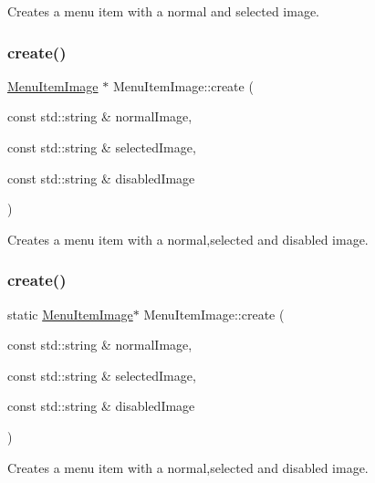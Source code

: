 Creates a menu item with a normal and selected image. \mbox{\label{classMenuItemImage_ab7a90cd28f289a7faafd9d1c7b37e78d}} 
\subsubsection{\texorpdfstring{create()}{create()}\hspace{0.1cm}{\footnotesize\ttfamily [5/14]}}
{\footnotesize\ttfamily \hyperlink{classMenuItemImage}{Menu\+Item\+Image} $\ast$ Menu\+Item\+Image\+::create (\begin{DoxyParamCaption}\item[{const std\+::string \&}]{normal\+Image,  }\item[{const std\+::string \&}]{selected\+Image,  }\item[{const std\+::string \&}]{disabled\+Image }\end{DoxyParamCaption})\hspace{0.3cm}{\ttfamily [static]}}

Creates a menu item with a normal,selected and disabled image. \mbox{\label{classMenuItemImage_af2ec388e058cb037959748c4db1daa63}} 
\subsubsection{\texorpdfstring{create()}{create()}\hspace{0.1cm}{\footnotesize\ttfamily [6/14]}}
{\footnotesize\ttfamily static \hyperlink{classMenuItemImage}{Menu\+Item\+Image}$\ast$ Menu\+Item\+Image\+::create (\begin{DoxyParamCaption}\item[{const std\+::string \&}]{normal\+Image,  }\item[{const std\+::string \&}]{selected\+Image,  }\item[{const std\+::string \&}]{disabled\+Image }\end{DoxyParamCaption})\hspace{0.3cm}{\ttfamily [static]}}

Creates a menu item with a normal,selected and disabled image. \mbox{\label{classMenuItemImage_ae36d584792a616fce4093b8f089aff6e}} 
